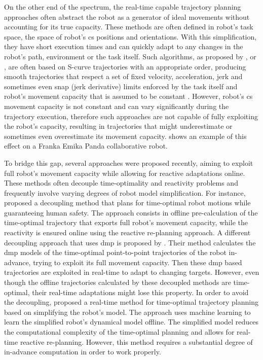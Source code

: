 On the other end of the spectrum, the real-time capable trajectory planning approaches often abstract the robot as a generator of ideal movements without accounting for its true capacity. These methods are often defined in robot's task space, the space of robot's \gls{cs} positions and orientations. With this simplification, they have short execution times and can quickly adapt to any changes in the robot's path, environment or the task itself. Such algorithms, as proposed by \citet{Macfarlane2003}, \citet{haschke2008line} or \citet{Svarny2022}, are often based on S-curve trajectories \cite{FANG2019} with an appropriate order, producing smooth trajectories that respect a set of fixed velocity, acceleration, jerk and sometimes even snap (jerk derivative) limits enforced by the task itself and robot's movement capacity that is assumed to be constant \cite{modernrobotics}. However, robot's \gls{cs} movement capacity is not constant and can vary significantly during the trajectory execution, therefore such approaches are not capable of fully exploiting the robot's capacity, resulting in trajectories that might underestimate or sometimes even overestimate its movement capacity.  shows an example of this effect on a Franka Emika Panda collaborative robot.


To bridge this gap, several approaches were proposed recently, aiming to exploit full robot's movement capacity while allowing for reactive adaptations online. These methods often decouple time-optimality and reactivity problems and frequently involve varying degrees of robot model simplification.
For instance, \citet{Palleschi2021} proposed a decoupling method that plans for time-optimal robot motions while guaranteeing human safety. The approach consists in offline pre-calculation of the time-optimal trajectory that exports full robot's movement capacity, while the reactivity is ensured online using the reactive re-planning approach. 
A different decoupling approach that uses \gls{dmp} is proposed by \citet{dmp2014}. Their method calculates the \gls{dmp} models of the time-optimal point-to-point trajectories of the robot in-advance, trying to exploit its full movement capacity. Then these \gls{dmp} based trajectories are exploited in real-time to adapt to changing targets. However, even though the offline trajectories calculated by these decoupled methods are time-optimal, their real-time adaptations might lose this property. 
In order to avoid the decoupling, \citet{ZHANG2020} proposed a real-time method for time-optimal trajectory planning based on simplifying the robot's model. The approach uses machine learning to learn the simplified robot's dynamical model offline. The simplified model reduces the computational complexity of the time-optimal planning and allows for real-time reactive re-planning. However, this method requires a substantial degree of in-advance computation in order to work properly. 


